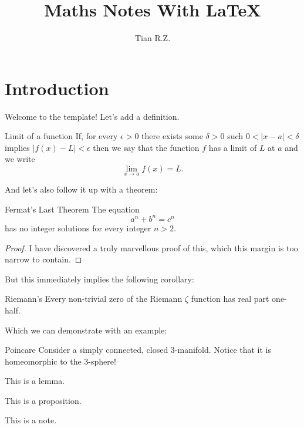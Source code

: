 \documentclass{MathNote}
\title{Maths Notes With \LaTeX}
\author{Tian R.Z.}
\begin{document}
	\maketitle
	\section{Introduction}
	Welcome to the template! Let's add a definition.
	\begin{definition}{Limit of a function}{}
	If, for every $ \epsilon >0 $ there exists some $ \delta >0 $ such $ 0<|x-a|<\delta $ implies $ |f(x)-L|<\epsilon $ then we say that the function $ f $ has a limit of $ L $ at $ a $ and we write
	\[\lim_{x\to a}f(x)=L.\]
	\end{definition}
	And let's also follow it up with a theorem:
	\begin{theorem}{Fermat's Last Theorem}{}
		The equation
		\[a^n+b^n=c^n\]
		has no integer solutions for every integer $ n> 2 $.
	\end{theorem}
	\begin{proof}
		I have discovered a truly marvellous proof of this, which this margin is too narrow to contain.
	\end{proof}
	But this immediately implies the following corollary:
	\begin{corollary}{Riemann's}{}
		Every non-trivial zero of the Riemann $ \zeta $ function has real part one-half.
	\end{corollary}
	Which we can demonstrate with an example:
	\begin{example}{Poincare}{}
		Consider a simply connected, closed 3-manifold. Notice that it is homeomorphic to the 3-sphere!
	\end{example}
	\begin{lemma}
		This is a lemma.
	\end{lemma}
	\begin{proposition}
		This is a proposition.
	\end{proposition}
	\begin{note}
		This is a note.
	\end{note}
		
\end{document}
